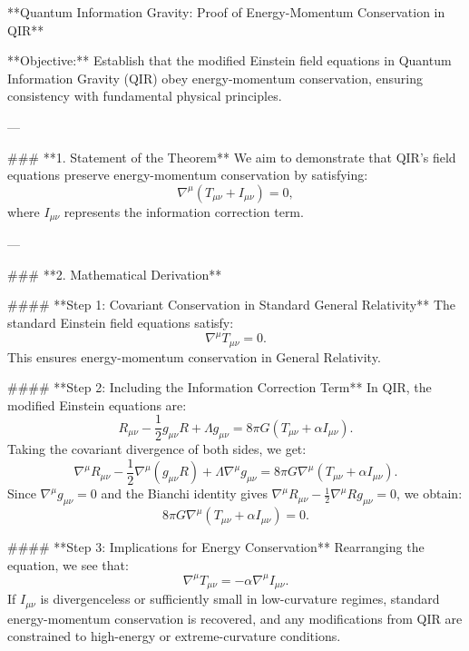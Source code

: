 **Quantum Information Gravity: Proof of Energy-Momentum Conservation in QIR**

**Objective:** Establish that the modified Einstein field equations in Quantum Information Gravity (QIR) obey energy-momentum conservation, ensuring consistency with fundamental physical principles.

---

### **1. Statement of the Theorem**
We aim to demonstrate that QIR’s field equations preserve energy-momentum conservation by satisfying:
\begin{equation}
    \nabla^\mu \left( T_{\mu \nu} + I_{\mu \nu} \right) = 0,
\end{equation}
where \( I_{\mu \nu} \) represents the information correction term.

---

### **2. Mathematical Derivation**

#### **Step 1: Covariant Conservation in Standard General Relativity**
The standard Einstein field equations satisfy:
\begin{equation}
    \nabla^\mu T_{\mu \nu} = 0.
\end{equation}
This ensures energy-momentum conservation in General Relativity.

#### **Step 2: Including the Information Correction Term**
In QIR, the modified Einstein equations are:
\begin{equation}
    R_{\mu \nu} - \frac{1}{2} g_{\mu \nu} R + \Lambda g_{\mu \nu} = 8 \pi G \left( T_{\mu \nu} + \alpha I_{\mu \nu} \right).
\end{equation}
Taking the covariant divergence of both sides, we get:
\begin{equation}
    \nabla^\mu R_{\mu \nu} - \frac{1}{2} \nabla^\mu \left( g_{\mu \nu} R \right) + \Lambda \nabla^\mu g_{\mu \nu} = 8 \pi G \nabla^\mu \left( T_{\mu \nu} + \alpha I_{\mu \nu} \right).
\end{equation}
Since \( \nabla^\mu g_{\mu \nu} = 0 \) and the Bianchi identity gives \( \nabla^\mu R_{\mu \nu} - \frac{1}{2} \nabla^\mu R g_{\mu \nu} = 0 \), we obtain:
\begin{equation}
    8 \pi G \nabla^\mu \left( T_{\mu \nu} + \alpha I_{\mu \nu} \right) = 0.
\end{equation}

#### **Step 3: Implications for Energy Conservation**
Rearranging the equation, we see that:
\begin{equation}
    \nabla^\mu T_{\mu \nu} = -\alpha \nabla^\mu I_{\mu \nu}.
\end{equation}
If \( I_{\mu \nu} \) is divergenceless or sufficiently small in low-curvature regimes, standard energy-momentum conservation is recovered, and any modifications from QIR are constrained to high-energy or extreme-curvature conditions.

